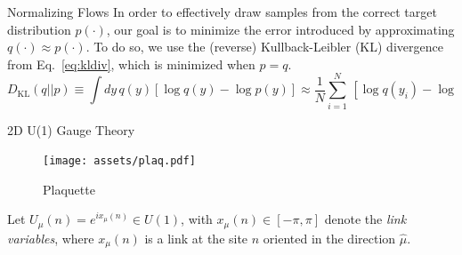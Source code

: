 \documentclass[final]{beamer}
\newlength{\colwidth}
\begin{document}
\begin{frame}[t]
\begin{columns}[t]
\begin{column}{\colwidth}
\begin{block}{Normalizing Flows}
    In order to effectively draw samples from the correct target distribution \(p(\cdot)\), our goal is to minimize the
    error introduced by approximating \(q(\cdot) \approx p(\cdot)\).
    To do so, we use the (reverse) Kullback-Leibler (KL) divergence from Eq.~\ref{eq:kldiv}, which is minimized when \(p
    = q\).
    \begin{equation}
      D_{\mathrm{KL}}(q||p) 
        \equiv \int dy\, q(y)[\log q(y) - \log p(y)]
        \approx \frac{1}{N} \sum_{i=1}^{N} \,[\log q(y_{i}) - \log p(y_{i})]\quad\text{where}\quad y_{i}\sim q.
        \label{eq:kldiv}
    \end{equation}
  \end{block}
  \begin{block}{2D U(1) Gauge Theory}
    \begin{figure}
      \texttt{[image: assets/plaq.pdf]}
      \caption{\label{fig:plaquette}Plaquette}%
    \end{figure}
    Let \(U_{\mu}(n) = e^{i x_{\mu}(n)} \in U(1)\), with \(x_{\mu}(n) \in \left[-\pi, \pi\right]\) denote the \emph{link
    variables}, where \(x_{\mu}(n)\) is a link at the site \(n\) oriented in the direction \(\hat\mu\).


\end{block}
\end{column}
\end{columns}
\end{frame}
\end{document}
